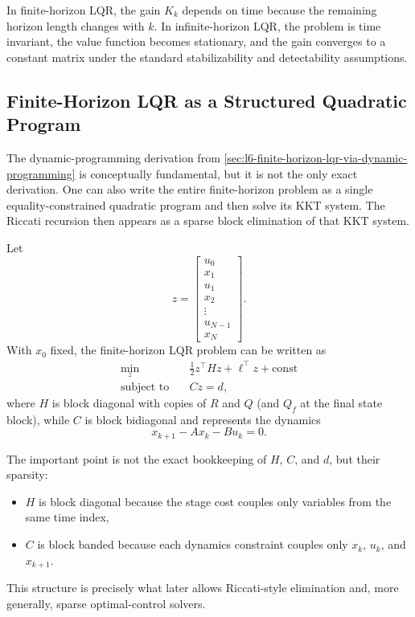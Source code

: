 \begin{remark}
	In finite-horizon LQR, the gain $K_k$ depends on time because the remaining horizon length changes with $k$. In infinite-horizon LQR, the problem is time invariant, the value function becomes stationary, and the gain converges to a constant matrix under the standard stabilizability and detectability assumptions.
\end{remark}

\subsection{Finite-Horizon LQR as a Structured Quadratic Program}
\label{sec:l6-finite-horizon-lqr-as-a-structured-quadratic-program}

\begin{remark}
	The dynamic-programming derivation from \autoref{sec:l6-finite-horizon-lqr-via-dynamic-programming} is conceptually fundamental, but it is not the only exact derivation. One can also write the entire finite-horizon problem as a single equality-constrained quadratic program and then solve its KKT system. The Riccati recursion then appears as a sparse block elimination of that KKT system.
\end{remark}

\begin{definition}\label{def:l6-stacked-qp-form-of-finite-horizon-lqr}
	Let
	\[
		z=
		\begin{bmatrix}
			u_0 \\
			x_1 \\
			u_1 \\
			x_2 \\
			\vdots \\
			u_{N-1} \\
			x_N
		\end{bmatrix}.
	\]
	With $x_0$ fixed, the finite-horizon LQR problem can be written as
	\begin{align*}
		\min_{z} \quad & \frac{1}{2}z^\top H z + \ell^\top z + \text{const} \\
		\text{subject to}\quad & Cz=d,
	\end{align*}
	where $H$ is block diagonal with copies of $R$ and $Q$ (and $Q_f$ at the final state block), while $C$ is block bidiagonal and represents the dynamics
	\[
		x_{k+1}-Ax_k-Bu_k=0.
	\]
\end{definition}

\begin{remark}
	The important point is not the exact bookkeeping of $H$, $C$, and $d$, but their sparsity:
	\begin{itemize}
		\item $H$ is block diagonal because the stage cost couples only variables from the same time index,
		\item $C$ is block banded because each dynamics constraint couples only $x_k$, $u_k$, and $x_{k+1}$.
	\end{itemize}
	This structure is precisely what later allows Riccati-style elimination and, more generally, sparse optimal-control solvers.
\end{remark}


